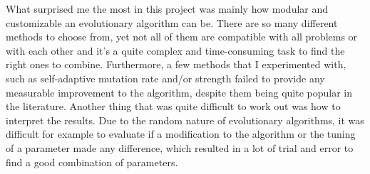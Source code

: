 \documentclass[a4paper,10pt]{article}
\newcommand{\ReplaceMe}[1]{{\color{blue}#1}}
\begin{document}
What surprised me the most in this project was mainly how modular and customizable an evolutionary algorithm can be. There are so many different methods to choose from, yet not all of them are compatible with all problems or with each other and it's a quite complex and time-consuming task to find the right ones to combine. Furthermore, a few methods that I experimented with, such as self-adaptive mutation rate and/or strength failed to provide any measurable improvement to the algorithm, despite them being quite popular in the literature. Another thing that was quite difficult to work out was how to interpret the results. Due to the random nature of evolutionary algorithms, it was difficult for example to evaluate if a modification to the algorithm or the tuning of a parameter made any difference, which resulted in a lot of trial and error to find a good combination of parameters.

%



\end{document}
